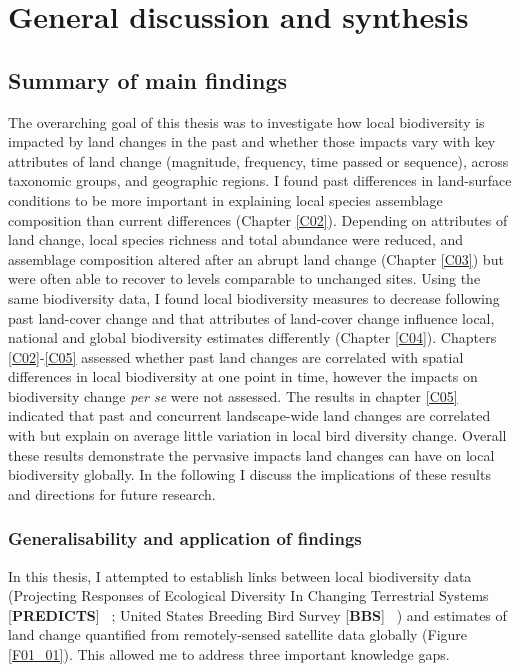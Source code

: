 \chapter{General discussion and synthesis}
\label{C06}

\section{Summary of main findings}
\label{C06_01}

The overarching goal of this thesis was to investigate how local biodiversity is impacted by land changes in the past and whether those impacts vary with key attributes of land change (\eg magnitude, frequency, time passed or sequence), across taxonomic groups, and geographic regions. I found past differences in land-surface conditions to be more important in explaining local species assemblage composition than current differences (Chapter \ref{C02}). Depending on attributes of land change, local species richness and total abundance were reduced, and assemblage composition altered after an abrupt land change (Chapter \ref{C03}) but were often able to recover to levels comparable to unchanged sites. Using the same biodiversity data, I found local biodiversity measures to decrease following past land-cover change and that attributes of land-cover change influence local, national and global biodiversity estimates differently (Chapter \ref{C04}). Chapters \ref{C02}-\ref{C05} assessed whether past land changes are correlated with spatial differences in local biodiversity at one point in time, however the impacts on biodiversity change \textit{per se} were not assessed. The results in chapter \ref{C05} indicated that past and concurrent landscape-wide land changes are correlated with but explain on average little variation in local bird diversity change. Overall these results demonstrate the pervasive impacts land changes can have on local biodiversity globally. In the following I discuss the implications of these results and directions for future research.

\subsection{Generalisability and application of findings}
\label{C06_0101}

In this thesis, I attempted to establish links between local biodiversity data (Projecting Responses of Ecological Diversity In Changing Terrestrial Systems [\textbf{PREDICTS}] \textendash\ \cite{Hudson2016}; United States Breeding Bird Survey [\textbf{BBS}] \textendash\ \cite{Pardieck2018}) and estimates of land change quantified from remotely-sensed satellite data globally (Figure \ref{F01_01}). This allowed me to address three important knowledge gaps.

